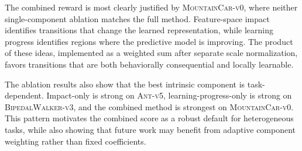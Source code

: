 The combined reward is most clearly justified by \textsc{MountainCar-v0}, where neither single-component ablation matches the full method.
Feature-space impact identifies transitions that change the learned representation, while learning progress identifies regions where the predictive model is improving.
The product of these ideas, implemented as a weighted sum after separate scale normalization, favors transitions that are both behaviorally consequential and locally learnable.

The ablation results also show that the best intrinsic component is task-dependent.
Impact-only is strong on \textsc{Ant-v5}, learning-progress-only is strong on \textsc{BipedalWalker-v3}, and the combined method is strongest on \textsc{MountainCar-v0}.
This pattern motivates the combined score as a robust default for heterogeneous tasks, while also showing that future work may benefit from adaptive component weighting rather than fixed coefficients.

\FloatBarrier